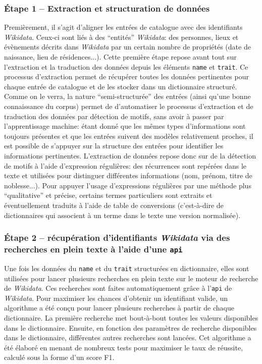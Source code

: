 \documentclass[a4paper, 12pt, twoside]{book}
\newcommand{\api}{\texttt{\gls{api}}}
\newcommand{\rgxpl}{\glspl{expression régulière}}
\newcommand{\tname}{\texttt{name}}
\newcommand{\ttrait}{\texttt{trait}}
\newcommand{\wkd}{\textit{Wikidata}}
\begin{document}
\subsubsection{Étape 1 -- Extraction et structuration de données}
Premièrement, il s'agit d'aligner les entrées de catalogue avec des identifiants \wkd{}. Ceux-ci sont liés à des \enquote{entités} \wkd{}: des personnes, lieux et évènements décrits dans \wkd{} par un certain nombre de propriétés (date de naissance, lieu de résidences...). Cette première étape repose avant tout sur l'extraction et la traduction des données depuis les éléments \tname{} et \ttrait{}. Ce processus d'extraction permet de récupérer toutes les données pertinentes pour chaque entrée de catalogue et de les stocker dans un \gls{dictionnaire} structuré. Comme on le verra, la nature \enquote{semi-structurée} des entrées (ainsi qu'une bonne connaissance du corpus) permet de d'automatiser le processus d'extraction et de traduction des données par détection de motifs, sans avoir à passer par l'apprentissage machine: étant donné que les mêmes types d'informations sont toujours présentes et que les entrées suivent des modèles relativement proches, il est possible de s'appuyer sur la structure des entrées pour identifier  les informations pertinentes. L'extraction de données repose donc sur de la détection de motifs à l'aide d'\rgxpl{}: des récurrences sont repérées dans le texte et utilisées pour distinguer différentes informations (nom, prénom, titre de noblesse...). Pour appuyer l'usage d'expressions régulières par une méthode plus \enquote{qualitative} et précise, certains termes particuliers sont extraits et éventuellement traduits à l'aide de \glspl{table de conversion} (c'est-à-dire de \glspl{dictionnaire} qui associent à un terme dans le texte une version normalisée). 

\subsubsection{Étape 2 -- récupération d'identifiants \wkd{} via des recherches en plein texte à l'aide d'une \api{}}
Une fois les données du \tname{} et du \ttrait{} structurées en dictionnaire, elles sont utilisées pour lancer plusieurs recherches en plein texte sur le moteur de recherche de \wkd{}. Ces recherches sont faites automatiquement grâce à l'\api{} de \wkd{}. Pour maximiser les chances d'obtenir un identifiant valide, un algorithme a été conçu pour lancer plusieurs recherches à partir de chaque dictionnaire. La première recherche met bout-à-bout toutes les valeurs disponibles dans le dictionnaire. Ensuite, en fonction des paramètres de recherche disponibles dans le dictionnaire, différentes autres recherches sont lancées. Cet algorithme a été élaboré en menant de nombreux tests pour maximiser le taux de réussite, calculé sous la forme d'un \gls{score F1}.
\end{document}
